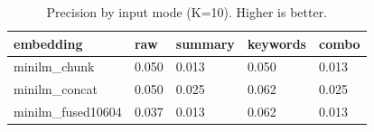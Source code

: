 \begin{table}
\caption{Precision by input mode (K=10). Higher is better.}
\label{tab:precision-by-mode}
\begin{tabular}{lllll}
\toprule
embedding & raw & summary & keywords & combo \\
\midrule
minilm_chunk & 0.050 & 0.013 & 0.050 & 0.013 \\
minilm_concat & 0.050 & 0.025 & 0.062 & 0.025 \\
minilm_fused10604 & 0.037 & 0.013 & 0.062 & 0.013 \\
\bottomrule
\end{tabular}
\end{table}

